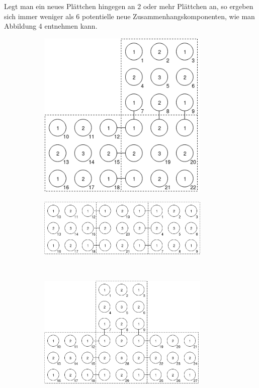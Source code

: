 \documentclass{article}
\begin{document}
Legt man ein neues Pl\"attchen hingegen an 2 oder mehr Pl\"attchen an, so ergeben sich immer weniger als $6$ potentielle neue Zusammenhangskomponenten, wie man Abbildung 4 entnehmen kann.
\begin{figure}[H]
	\centering
	\begin{subfigure}{.5\textwidth}
		\centering
		\includegraphics[width=0.9\textwidth]{aufgabe2_2.png}
	\end{subfigure}%
	\begin{subfigure}{.5\textwidth}
		\centering
		\includegraphics[width=0.9\textwidth]{aufgabe2_3.png}
	\end{subfigure}\\
	\begin{subfigure}{.5\textwidth}
		\centering
		\includegraphics[width=0.9\textwidth]{aufgabe2_4.png}

\end{subfigure}
\end{figure}
\end{document}
